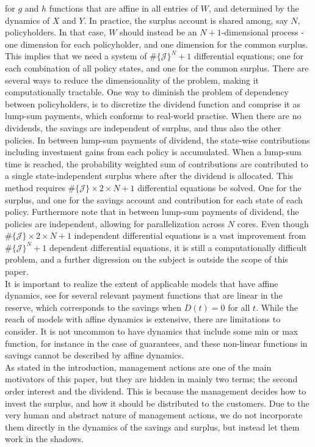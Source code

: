 \documentclass[12pt]{article}
\theoremstyle{my_thm}
\begin{document}
for $g$ and $h$ functions that are affine in all entries of $W$, and determined by the dynamics of $X$ and $Y$. In practice, the surplus account is shared among, say $N$, policyholders. In that case, $W$ should instead be an $N+1$-dimensional process - one dimension for each policyholder, and one dimension for the common surplus. This implies that we need a system of $\# \{ \mathcal{J} \}^N+1$ differential equations; one for each combination of all policy states, and one for the common surplus. There are several ways to reduce the dimensionality of the problem, making it computationally tractable. One way to diminish the problem of dependency between policyholders, is to discretize the dividend function and comprise it as lump-sum payments, which conforms to real-world practise. When there are no dividends, the savings are independent of surplus, and thus also the other policies. In between lump-sum payments of dividend, the state-wise contributions including investment gains from each policy is accumulated. When a lump-sum time is reached, the probability weighted sum of contributions are contributed to a single state-independent surplus where after the dividend is allocated. This method requires $\# \{ \mathcal{J} \} \times 2 \times N + 1$ differential equations be solved. One for the surplus, and one for the savings account and contribution for each state of each policy. Furthermore note that in between lump-sum payments of dividend, the policies are independent, allowing for parallelization across $N$ cores. Even though $\# \{ \mathcal{J} \} \times 2 \times N + 1$ independent differential equations is a vast improvement from $\# \{ \mathcal{J} \}^N + 1$ dependent differential equations, it is still a computationally difficult problem, and a further digression on the subject is outside the scope of this paper.
\\[12pt]
It is important to realize the extent of applicable models that have affine dynamics, see \citet{Christiansen} for several relevant payment functions that are linear in the reserve, which corresponds to the savings when $D(t)=0$ for all $t$. While the reach of models with affine dynamics is extensive, there are limitations to consider. It is not uncommon to have dynamics that include some min or max function, for instance in the case of guarantees, and these non-linear functions in savings cannot be described by affine dynamics. \\
As stated in the introduction, management actions are one of the main motivators of this paper, but they are hidden in mainly two terms; the second order interest and the dividend. This is because the management decides how to invest the surplus, and how it should be distributed to the customers. Due to the very human and abstract nature of management actions, we do not incorporate them directly in the dynamics of the savings and surplus, but instead let them work in the shadows.
\end{document}
